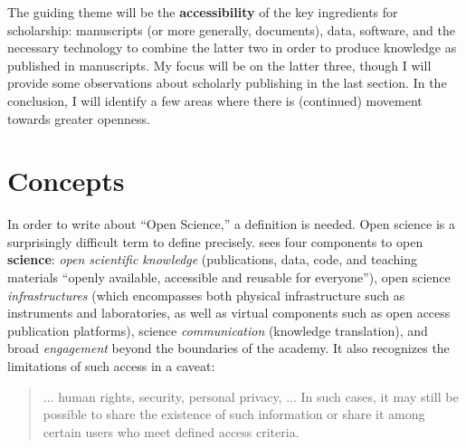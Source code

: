 \documentclass{article}
\begin{document}
The guiding theme will be the \textbf{accessibility} of the key ingredients for scholarship: manuscripts (or more generally, documents), data, software, and the necessary technology to combine the latter two in order to produce knowledge as published in manuscripts. My focus will be on the latter three, though I will provide some observations about scholarly publishing in the last section.
In the conclusion, I will identify a few areas where there is (continued) movement towards greater openness. 



\section{Concepts}

In order to write about ``Open Science,'' a definition is needed. Open science is a surprisingly difficult term to define precisely. 
%
\citet{unesco_understanding_2022} sees four components to open \textbf{science}: \textit{open   scientific   knowledge }(publications, data, code, and teaching materials ``openly    available, accessible and reusable for everyone''),     open     science     \textit{infrastructures} (which encompasses both physical infrastructure such as instruments and laboratories, as well as virtual components such as open access publication platforms),     science     \textit{communication} (knowledge translation),  and broad \textit{engagement} beyond the boundaries of the academy. It also recognizes the limitations of such access in a caveat: 

\begin{quote}

...  human rights, security, personal privacy, ... In such  cases,  it  may  still  be  possible  to  share  the  existence  of  such  information or share it among certain users who meet defined access criteria.
    
\end{quote}
\end{document}

